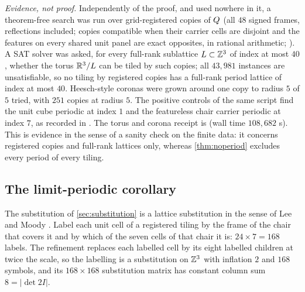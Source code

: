 \emph{Evidence, not proof.} Independently of the proof, and used nowhere in it, a theorem-free
search was run over grid-registered copies of $Q$ (all $48$ signed frames, reflections
included; copies compatible when their carrier cells are disjoint and the features on every
shared unit panel are exact opposites, in rational arithmetic;
). A SAT solver was asked, for every full-rank sublattice
$L\subset\mathbb{Z}^3$ of index at most $40$, whether the torus $\mathbb{R}^3/L$ can be tiled by such copies;
all $43{,}981$ instances are unsatisfiable, so no tiling by registered copies has a full-rank
period lattice of index at most $40$. Heesch-style coronas were grown around one copy to radius
$5$ of $5$ tried, with $251$ copies at radius $5$. The positive controls of the same script find
the unit cube periodic at index $1$ and the featureless chair carrier periodic at index $7$,
as recorded in .
The torus and corona receipt is 
(wall time $108{,}682$ s). This is
evidence in the sense of a sanity check on the finite data: it concerns registered copies and
full-rank lattices only, whereas \cref{thm:noperiod} excludes every period of every tiling.







\subsection{The limit-periodic corollary}\label{sec:limitperiodic}

The substitution of \cref{sec:substitution} is a lattice substitution in the sense of Lee and
Moody \cite{LM01}. Label each unit cell of a registered tiling by the frame of the chair that
covers it and by which of the seven cells of that chair it is: $24\times7=168$ labels. The
refinement replaces each labelled cell by its eight labelled children at twice the scale, so the
labelling is a substitution on $\mathbb{Z}^3$ with inflation $2$ and $168$ symbols, and its $168\times168$
substitution matrix has constant column sum $8=|\det 2I|$.

